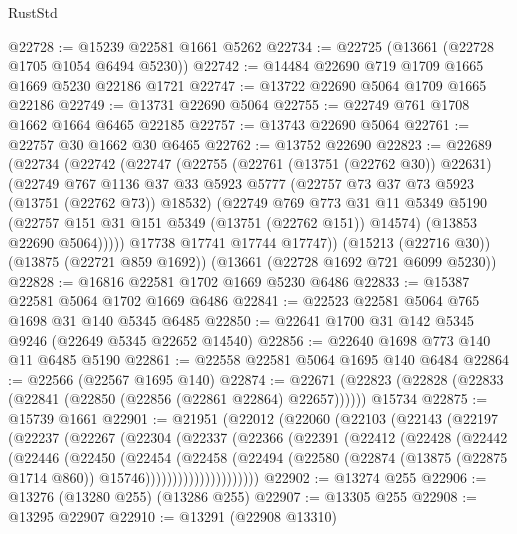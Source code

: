 \begin{lexlean}{RustStd}
\begin{coremodule}
@22728 := @15239 @22581 @1661 @5262
@22734 := @22725 (@13661 (@22728 @1705 @1054 @6494 @5230))
@22742 := @14484 @22690 @719 @1709 @1665 @1669 @5230 @22186 @1721
@22747 := @13722 @22690 @5064 @1709 @1665 @22186
@22749 := @13731 @22690 @5064
@22755 := @22749 @761 @1708 @1662 @1664 @6465 @22185
@22757 := @13743 @22690 @5064
@22761 := @22757 @30 @1662 @30 @6465
@22762 := @13752 @22690
@22823 := @22689
    (@22734
      (@22742
        (@22747
          (@22755
            (@22761 (@13751 (@22762 @30)) @22631)
            (@22749
              @767
              @1136
              @37
              @33
              @5923
              @5777
              (@22757 @73 @37 @73 @5923 (@13751 (@22762 @73)) @18532)
              (@22749
                @769
                @773
                @31
                @11
                @5349
                @5190
                (@22757 @151 @31 @151 @5349 (@13751 (@22762 @151)) @14574)
                (@13853 @22690 @5064)))))
        @17738
        @17741
        @17744
        @17747))
    (@15213 (@22716 @30))
    (@13875 (@22721 @859 @1692))
    (@13661 (@22728 @1692 @721 @6099 @5230))
@22828 := @16816 @22581 @1702 @1669 @5230 @6486
@22833 := @15387 @22581 @5064 @1702 @1669 @6486
@22841 := @22523 @22581 @5064 @765 @1698 @31 @140 @5345 @6485
@22850 := @22641 @1700 @31 @142 @5345 @9246 (@22649 @5345 @22652 @14540)
@22856 := @22640 @1698 @773 @140 @11 @6485 @5190
@22861 := @22558 @22581 @5064 @1695 @140 @6484
@22864 := @22566 (@22567 @1695 @140)
@22874 := @22671 (@22823 (@22828 (@22833 (@22841 (@22850 (@22856 (@22861 @22864) @22657)))))) @15734
@22875 := @15739 @1661
@22901 := @21951
    (@22012
      (@22060
        (@22103
          (@22143
            (@22197
              (@22237
                (@22267
                  (@22304
                    (@22337
                      (@22366
                        (@22391
                          (@22412
                            (@22428
                              (@22442
                                (@22446
                                  (@22450
                                    (@22454
                                      (@22458
                                        (@22494
                                          (@22580
                                            (@22874
                                              (@13875 (@22875 @1714 @860))
                                              @15746)))))))))))))))))))))
@22902 := @13274 @255
@22906 := @13276 (@13280 @255) (@13286 @255)
@22907 := @13305 @255
@22908 := @13295 @22907
@22910 := @13291 (@22908 @13310)

\end{coremodule}
\end{lexlean}
